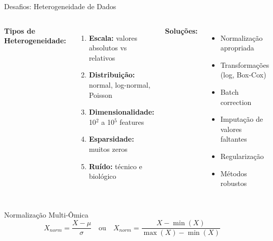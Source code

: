 \begin{frame}{Desafios: Heterogeneidade de Dados}
\begin{columns}
\textbf{Tipos de Heterogeneidade:}
\begin{enumerate}
    \item \textbf{Escala:} valores absolutos vs relativos
    \item \textbf{Distribuição:} normal, log-normal, Poisson
    \item \textbf{Dimensionalidade:} 10$^2$ a 10$^5$ features
    \item \textbf{Esparsidade:} muitos zeros
    \item \textbf{Ruído:} técnico e biológico
\end{enumerate}

\textbf{Soluções:}
\begin{itemize}
    \item Normalização apropriada
    \item Transformações (log, Box-Cox)
    \item Batch correction
    \item Imputação de valores faltantes
    \item Regularização
    \item Métodos robustos
\end{itemize}
\end{columns}

\vspace{0.3cm}

\begin{alertblock}{Normalização Multi-Ômica}
\begin{equation*}
X_{norm} = \frac{X - \mu}{\sigma} \quad \text{ou} \quad X_{norm} = \frac{X - \min(X)}{\max(X) - \min(X)}
\end{equation*}
\end{alertblock}
\end{frame}

